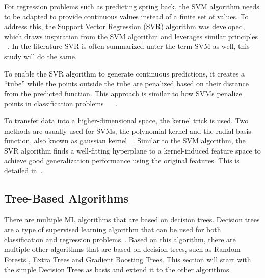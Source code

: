 For regression problems such as predicting spring back, the \ac{SVM} algorithm
needs to be adapted to provide continuous values instead of a finite set of values.
To address this, the Support Vector Regression (SVR) algorithm was developed, which draws inspiration from the
\ac{SVM} algorithm and leverages similar principles
~\cite[p. 92]{muller2016introduction}.
In the literature SVR is often summarized unter the term SVM as well, this study will do the same.

To enable the \ac{SVR} algorithm to generate continuous predictions, it creates a ``tube''
while the points outside the tube are penalized based on their distance from the
predicted function.
This approach is similar to how \ac{SVM}s penalize points in classification
problems
~\cite[p. 369]{montesinos2022support}
~\cite[pp. 67--68]{awad2015efficient}.

To transfer data into a higher-dimensional space, the kernel trick is used.
Two methods are usually used for \ac{SVM}s, the polynomial kernel and the radial basis
function, also known as gaussian kernel
~\cite[p. 97--98]{muller2016introduction}.
Similar to the \ac{SVM} algorithm, the \ac{SVR} algorithm finds a well-fitting hyperplane to a
kernel-induced feature space to achieve good generalization performance using the original
features.
This is detailed in~\cite[p. 369]{montesinos2022support}.

\subsection{Tree-Based Algorithms}\label{subsec:tree-based-algorithms}

There are multiple \ac{ML} algorithms that are based on decision trees.
Decision trees are a type of supervised learning algorithm that can be used for both classification and regression
problems~\cite[p. 70]{muller2016introduction}.
Based on this algorithm, there are multiple other algorithms that are based on decision trees, such as Random Forests
, Extra Trees and Gradient Boosting Trees.
This section will start with the simple Decision Trees as basis and extend it to the other algorithms.


